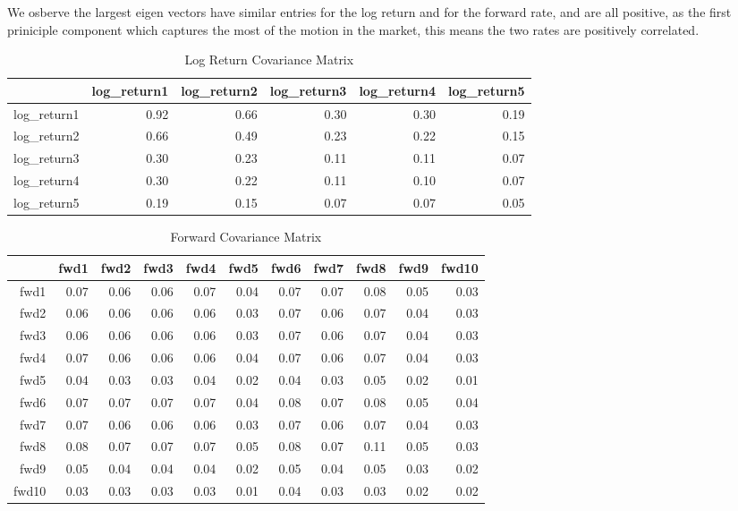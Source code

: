 \documentclass{article}
\begin{document}
\begin{enumerate}
    We osberve the largest eigen vectors have similar entries for the log return and for the forward rate, and are all positive, as the first priniciple component which captures the most of the motion in the market, this means the two rates are positively correlated.
    \begin{table}[ht]
    \centering
    \begin{tabular}{rrrrrr}
    \hline 
 & log\_return1 & log\_return2 & log\_return3 & log\_return4 & log\_return5 \\ 
    \hline
log\_return1 & 0.92 & 0.66 & 0.30 & 0.30 & 0.19 \\ 
  log\_return2 & 0.66 & 0.49 & 0.23 & 0.22 & 0.15 \\ 
  log\_return3 & 0.30 & 0.23 & 0.11 & 0.11 & 0.07 \\ 
  log\_return4 & 0.30 & 0.22 & 0.11 & 0.10 & 0.07 \\ 
  log\_return5 & 0.19 & 0.15 & 0.07 & 0.07 & 0.05 \\ 
   \hline
    \end{tabular}
    \caption{Log Return Covariance Matrix}
    \label{5}
    \end{table}

    \begin{table}[ht]
    \centering
    \begin{tabular}{rrrrrrrrrrr}
    \hline
& fwd1 & fwd2 & fwd3 & fwd4 & fwd5 & fwd6 & fwd7 & fwd8 & fwd9 & fwd10 \\ 
    \hline
fwd1 & 0.07 & 0.06 & 0.06 & 0.07 & 0.04 & 0.07 & 0.07 & 0.08 & 0.05 & 0.03 \\ 
  fwd2 & 0.06 & 0.06 & 0.06 & 0.06 & 0.03 & 0.07 & 0.06 & 0.07 & 0.04 & 0.03 \\ 
  fwd3 & 0.06 & 0.06 & 0.06 & 0.06 & 0.03 & 0.07 & 0.06 & 0.07 & 0.04 & 0.03 \\ 
  fwd4 & 0.07 & 0.06 & 0.06 & 0.06 & 0.04 & 0.07 & 0.06 & 0.07 & 0.04 & 0.03 \\ 
  fwd5 & 0.04 & 0.03 & 0.03 & 0.04 & 0.02 & 0.04 & 0.03 & 0.05 & 0.02 & 0.01 \\ 
  fwd6 & 0.07 & 0.07 & 0.07 & 0.07 & 0.04 & 0.08 & 0.07 & 0.08 & 0.05 & 0.04 \\ 
  fwd7 & 0.07 & 0.06 & 0.06 & 0.06 & 0.03 & 0.07 & 0.06 & 0.07 & 0.04 & 0.03 \\ 
  fwd8 & 0.08 & 0.07 & 0.07 & 0.07 & 0.05 & 0.08 & 0.07 & 0.11 & 0.05 & 0.03 \\ 
  fwd9 & 0.05 & 0.04 & 0.04 & 0.04 & 0.02 & 0.05 & 0.04 & 0.05 & 0.03 & 0.02 \\ 
  fwd10 & 0.03 & 0.03 & 0.03 & 0.03 & 0.01 & 0.04 & 0.03 & 0.03 & 0.02 & 0.02 \\ 
   \hline
\end{tabular}
\caption{Forward Covariance Matrix}
\end{table}
\label{6}


\end{enumerate}
\end{document}
